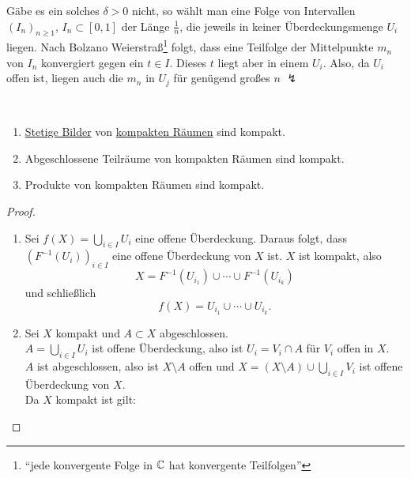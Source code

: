 \begin{remark}
  Gäbe es ein solches $ \delta > 0 $ nicht, so wählt man eine Folge von Intervallen $ (I_n)_{n \geq 1} $, $ I_n \subset [0,1] $ der Länge $ \tfrac{1}{n} $, die jeweils in keiner Überdeckungsmenge $ U_i $ liegen. Nach Bolzano Weierstraß\footnote{``jede konvergente Folge in $ \mathbb{C} $ hat konvergente Teilfolgen''} folgt, dass eine Teilfolge der Mittelpunkte $ m_n $ von $ I_n $ konvergiert gegen ein $ t \in I $. Dieses $ t $ liegt aber in einem $ U_i $. Also, da $ U_i $ offen ist, liegen auch die $ m_n $ in $ U_j $ für genügend großes $ n $ $ \lightning $
\end{remark}

\begin{theorem}
  \
  \begin{enumerate}
    \item \hyperref[def:stetig]{Stetige Bilder} von \hyperref[def:kompakt]{kompakten Räumen} sind kompakt.
    \item Abgeschlossene Teilräume von kompakten Räumen sind kompakt.
    \item Produkte von kompakten Räumen sind kompakt. 
  \end{enumerate}
  \begin{proof}
    \
    \begin{enumerate}
      \item Sei $ f(X) = \bigcup_{i \in I} U_i $ eine offene Überdeckung. Daraus folgt, dass $ \left( F^{-1}(U_i) \right)_{i \in I} $ eine offene Überdeckung von $ X $ ist. $ X $ ist kompakt, also
      \begin{equation*}
        X = F^{-1}(U_{i_1}) \cup \cdots \cup F^{-1}(U_{i_k})
      \end{equation*}
      und schließlich
      \begin{equation*}
        f(X) = U_{i_1} \cup \cdots \cup U_{i_k}\text{.}
      \end{equation*}
      \item Sei $ X $ kompakt und $ A \subset X $ abgeschlossen. \\
        $ A = \bigcup_{i \in I} U_i $ ist offene Überdeckung, also ist $ U_i = V_i \cap A $ für $ V_i $ offen in $ X $. \\
        $ A $ ist abgeschlossen, also ist $ X \setminus A $ offen und $ X = (X \setminus A) \cup \bigcup_{i \in I} V_i $ ist offene Überdeckung von $ X $. \\
        Da $ X $ kompakt ist gilt:

\end{enumerate}
\end{proof}
\end{theorem}
